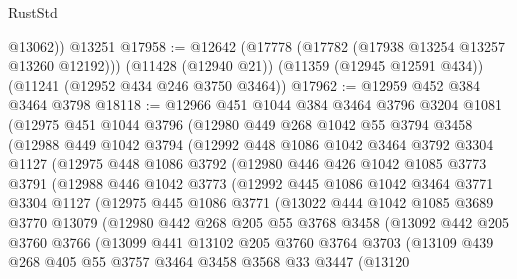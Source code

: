 \begin{lexlean}{RustStd}
\begin{coremodule}
{{{{{{{{{{{{{{{{{{{        @13062))
    @13251
@17958 := @12642
    (@17778 (@17782 (@17938 @13254 @13257 @13260 @12192)))
    (@11428 (@12940 @21))
    (@11359 (@12945 @12591 @434))
    (@11241 (@12952 @434 @246 @3750 @3464))
@17962 := @12959 @452 @384 @3464 @3798
@18118 := @12966
    @451
    @1044
    @384
    @3464
    @3796
    @3204
    @1081
    (@12975
      @451
      @1044
      @3796
      (@12980
        @449
        @268
        @1042
        @55
        @3794
        @3458
        (@12988
          @449
          @1042
          @3794
          (@12992
            @448
            @1086
            @1042
            @3464
            @3792
            @3304
            @1127
            (@12975
              @448
              @1086
              @3792
              (@12980
                @446
                @426
                @1042
                @1085
                @3773
                @3791
                (@12988
                  @446
                  @1042
                  @3773
                  (@12992
                    @445
                    @1086
                    @1042
                    @3464
                    @3771
                    @3304
                    @1127
                    (@12975
                      @445
                      @1086
                      @3771
                      (@13022
                        @444
                        @1042
                        @1085
                        @3689
                        @3770
                        @13079
                        (@12980
                          @442
                          @268
                          @205
                          @55
                          @3768
                          @3458
                          (@13092
                            @442
                            @205
                            @3760
                            @3766
                            (@13099
                              @441
                              @13102
                              @205
                              @3760
                              @3764
                              @3703
                              (@13109
                                @439
                                @268
                                @405
                                @55
                                @3757
                                @3464
                                @3458
                                @3568
                                @33
                                @3447
                                (@13120
}}}}}}}}}}}}}}}}}}}
\end{coremodule}
\end{lexlean}

